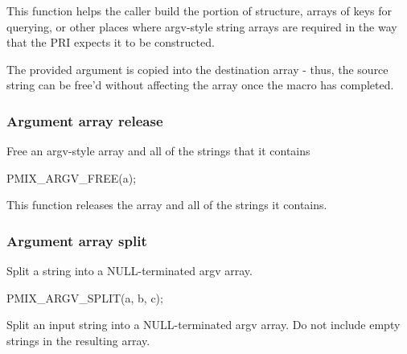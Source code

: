 \descr

This function helps the caller build the  portion of  structure, arrays of keys for querying, or other places where argv-style string arrays are required in the way that the \ac{PRI} expects it to be constructed.

\adviceuserstart
The provided argument is copied into the destination array - thus, the source string can be free'd without affecting the array once the macro has completed.
\adviceuserend

\subsubsection{Argument array release}

\summary

Free an argv-style array and all of the strings that it contains

\cspecificstart
\begin{codepar}
PMIX_ARGV_FREE(a);
\end{codepar}
\cspecificend

\begin{arglist}
\end{arglist}

\descr

This function releases the array and all of the strings it contains.

\subsubsection{Argument array split}

\summary

Split a string into a NULL-terminated argv array.

\cspecificstart
\begin{codepar}
PMIX_ARGV_SPLIT(a, b, c);
\end{codepar}
\cspecificend

\begin{arglist}
\end{arglist}

\descr

Split an input string into a NULL-terminated argv array. Do not include empty strings in the resulting array.

